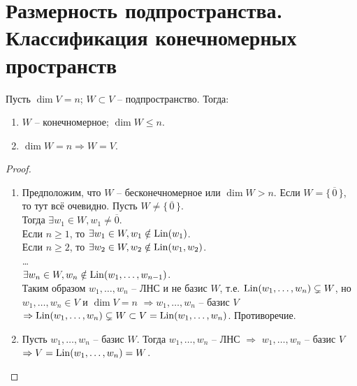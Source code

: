 
\section{Размерность подпространства. Классификация конечномерных пространств}

\begin{theorem-non}
\end{theorem-non}
Пусть $\dim V = n$; $W \subset V$ -- подпространство. Тогда:
\begin{enumerate}
    \item $W$ -- конечномерное; $\dim W \leq n$.
    \item $\dim W = n \Rightarrow W = V$.
\end{enumerate}
\begin{proof} $ $

    \begin{enumerate}
        \item Предположим, что $W$ -- бесконечномерное или $\dim W > n$.
        Если $W = \{\,\overline{0}\,\}$, то тут всё очевидно. 
        Пусть $W \neq \{\,\overline{0}\,\}$. \\
        Тогда $\exists w_1 \in W, w_1 \neq \overline{0}$. \\
        Если $n \geqslant 1$, то $\exists w_1 \in W, 
        w_1 \notin \operatorname{Lin}(w_1)$.\\
        Если $n \geqslant 2$, то $\exists w_2 \in W, 
        w_2 \notin \operatorname{Lin}(w_1, w_2)$.\\
        \dots\\
        $\exists w_n \in W, 
        w_n \notin \operatorname{Lin}(w_1, \dots, w_{n-1})$.\\
        Таким образом $w_1, \dots, w_n$ -- ЛНС и не базис $W$,
        т.е. $\operatorname{Lin}(w_1, \dots, w_n) \subsetneq W$, но
        $w_1, \dots, w_n \in V$ и $\dim V = n$ $\Rightarrow
        w_1, \dots, w_n$ -- базис $V$ $\Rightarrow
        \operatorname{Lin}(w_1, \dots, w_n) \subsetneq W \subset V = 
        \operatorname{Lin}(w_1, \dots, w_n)$. Противоречие.

        \item Пусть $w_1, \dots, w_n$ -- базис $W$. Тогда
        $w_1, \dots, w_n$ -- ЛНС $\Rightarrow$ $w_1, \dots, w_n$ --
        базис $V$ $\Rightarrow V = \operatorname{Lin}(w_1, \dots, w_n) = W$.
    \end{enumerate}
\end{proof}

